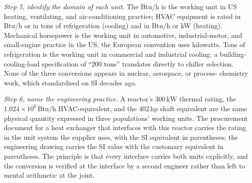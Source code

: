 \begin{exercise}
\textit{Step 5, identify the domain of each unit.} The Btu/h is
the working unit in US heating, ventilating, and air-conditioning
practice; HVAC equipment is rated in Btu/h or in tons of
refrigeration (cooling) and in Btu/h or kW (heating). Mechanical
horsepower is the working unit in automotive, industrial-motor, and
small-engine practice in the US; the European convention uses
kilowatts. Tons of refrigeration is the working unit in commercial
and industrial cooling: a building-cooling-load specification of
``200 tons'' translates directly to chiller selection. None of the
three conversions appears in nuclear, aerospace, or process-
chemistry work, which standardised on SI decades ago.

\textit{Step 6, name the engineering practice.} A reactor's
$300 \,\si{\kilo\watt}$ thermal rating, the $1.024 \times 10^{6}
\,\text{Btu}/\text{h}$ HVAC-equivalent, and the $402 \,\text{hp}$
shaft equivalent are the same physical quantity expressed in three
populations' working units. The procurement document for a heat
exchanger that interfaces with this reactor carries the rating in
the unit system the supplier uses, with the SI equivalent in
parentheses; the engineering drawing carries the SI value with
the customary equivalent in parentheses. The principle is that
every interface carries both units explicitly, and the conversion
is verified at the interface by a second engineer rather than left
to mental arithmetic at the joint.
\end{exercise}

